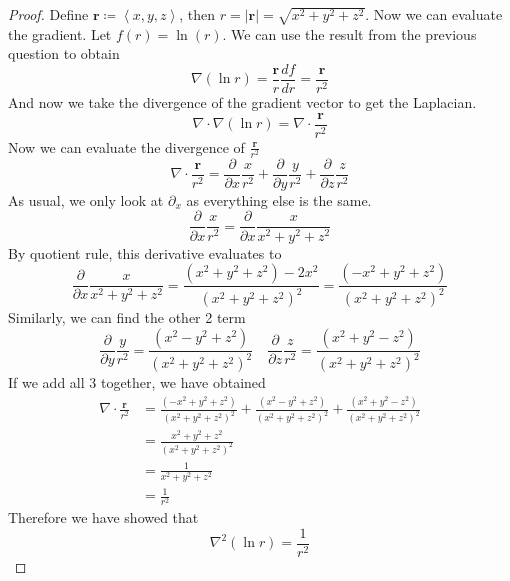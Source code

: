 \documentclass[12pt]{article}
\newcommand{\pypx}[2]{\frac{\partial #1}{\partial #2}}
\newcommand{\divg}{\nabla \cdot}
\newcommand{\dydx}[2]{\frac{d #1}{d #2}}
\newcommand{\paren}[1]{\left( #1 \right)}
\newcommand{\tribkt}[1]{\left< #1 \right>}
\newcommand{\abso}[1]{\left|#1 \right|}
\begin{document}
\begin{enumerate}
\begin{enumerate}[(a)]
            \begin{proof}
                Define $\mathbf{r}\coloneqq \tribkt{x,y,z}$, then $r = \abso{\mathbf{r}} = \sqrt{x^2 + y^2 + z^2}$. Now we can evaluate the gradient. Let $f(r) = \ln(r)$. We can use the result from the previous question to obtain
                \[
                \nabla\paren{\ln r} = \frac{\mathbf{r}}{r}\dydx{f}{r} = \frac{\mathbf{r}}{r^2}
                \]
                And now we take the divergence of the gradient vector to get the Laplacian.
                \[
                \divg\nabla\paren{\ln r} = \divg \frac{\mathbf{r}}{r^2}
                \]
                Now we can evaluate the divergence of $\frac{\mathbf{r}}{r^2}$
                \[
                \divg \frac{\mathbf{r}}{r^2} = \pypx{}{x}\frac{x}{r^2} + \pypx{}{y}\frac{y}{r^2} + \pypx{}{z}\frac{z}{r^2}
                \]
                As usual, we only look at $\partial_x$ as everything else is the same. 
                \[
                \pypx{}{x}\frac{x}{r^2} = \pypx{}{x} \frac{x}{x^2 + y^2 + z^2} 
                \]
                By quotient rule, this derivative evaluates to
                \[
                \pypx{}{x} \frac{x}{x^2 + y^2 + z^2}  = \frac{\paren{x^2 + y^2 + z^2} - 2x^2}{\paren{x^2 + y^2 + z^2}^2} = \frac{\paren{-x^2 + y^2 + z^2}}{\paren{x^2 + y^2 + z^2}^2}
                \]
                Similarly, we can find the other 2 term
                \[
                \pypx{}{y}\frac{y}{r^2} = \frac{\paren{x^2 - y^2 + z^2}}{\paren{x^2 + y^2 + z^2}^2} \quad 
                \pypx{}{z}\frac{z}{r^2} = \frac{\paren{x^2 + y^2 - z^2}}{\paren{x^2 + y^2 + z^2}^2} 
                \]
                If we add all 3 together, we have obtained
                \begin{align*}
                \divg \frac{\mathbf{r}}{r^2} &= \frac{\paren{-x^2 + y^2 + z^2}}{\paren{x^2 + y^2 + z^2}^2}+ \frac{\paren{x^2 - y^2 + z^2}}{\paren{x^2 + y^2 + z^2}^2}+\frac{\paren{x^2 + y^2 - z^2}}{\paren{x^2 + y^2 + z^2}^2}\\
                &= \frac{x^2 + y^2 + z^2}{\paren{x^2 + y^2 + z^2}^2}\\
                & = \frac{1}{x^2 + y^2 + z^2}\\
                &= \frac{1}{r^2}
                \end{align*}
                Therefore we have showed that
                \[
                \nabla^2\paren{\ln r} = \frac{1}{r^2}
                \]
            \end{proof}
        \end{enumerate}


\end{enumerate}
\end{document}
